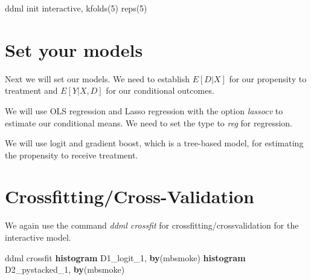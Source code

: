 \documentclass[
]{book}
\newenvironment{Shaded}{\begin{snugshade}}{\end{snugshade}}
\newcommand{\DecValTok}[1]{\textcolor[rgb]{0.00,0.00,0.81}{#1}}
\newcommand{\KeywordTok}[1]{\textcolor[rgb]{0.13,0.29,0.53}{\textbf{#1}}}
\newcommand{\NormalTok}[1]{#1}
\newcommand{\OtherTok}[1]{\textcolor[rgb]{0.56,0.35,0.01}{#1}}
\begin{document}
\begin{Shaded}
\begin{Highlighting}[]
\NormalTok{ddml init interactive, kfolds(5) reps(5)}
\end{Highlighting}
\end{Shaded}

\section{Set your models}\label{set-your-models}

Next we will set our models. We need to establish \(E[D|X]\) for our propensity to treatment and \(E[Y|X,D]\) for our conditional outcomes.

We will use OLS regression and Lasso regression with the option \emph{lassocv} to estimate our conditional means. We need to set the type to \emph{reg} for regression.

\begin{Shaded}
\end{Shaded}

We will use logit and gradient boost, which is a tree-based model, for estimating the propensity to receive treatment.

\begin{Shaded}
\end{Shaded}

\section{Crossfitting/Cross-Validation}\label{crossfittingcross-validation-1}

We again use the command \emph{ddml crossfit} for crossfitting/crossvalidation for the interactive model.

\begin{Shaded}
\begin{Highlighting}[]
\NormalTok{ddml crossfit}
\KeywordTok{histogram}\NormalTok{ D1\_logit\_1, }\KeywordTok{by}\NormalTok{(mbsmoke)}
\KeywordTok{histogram}\NormalTok{ D2\_pystacked\_1, }\KeywordTok{by}\NormalTok{(mbsmoke)}
\end{Highlighting}
\end{Shaded}
\end{document}
